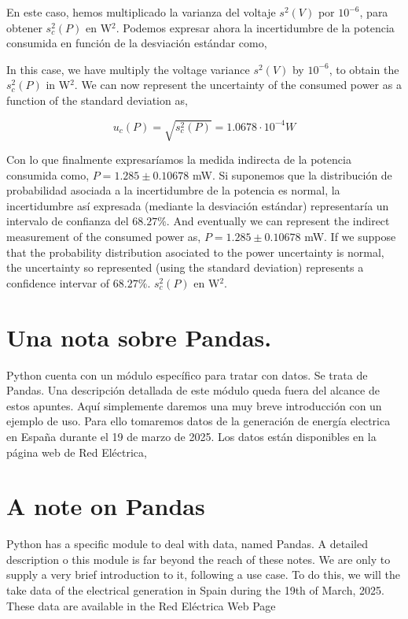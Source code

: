 \begin{paracol}{2}
En este caso, hemos multiplicado la varianza del voltaje $s^2(V)$ por $10^{-6}$, para obtener $s_c^2(P)$ en W$^2$. Podemos expresar ahora la incertidumbre de la potencia consumida en función de la desviación estándar como,

\switchcolumn
In this case, we have multiply the voltage variance $s^2(V)$ by $10^{-6}$, to obtain the $s_c^2(P)$ in W$^2$. We can now represent the uncertainty of the consumed power as a function of the standard deviation as,
\end{paracol}
\begin{equation*}
u_c(P) = \sqrt{s_c^2(P)} =  1.0678\cdot 10^{-4} W
\end{equation*}
\begin{paracol}{2}
Con lo que finalmente expresaríamos la medida indirecta de la potencia consumida como, $P = 1.285 \pm 0.10678 $ mW. Si suponemos que la distribución de probabilidad asociada a la incertidumbre de la potencia es normal, la incertidumbre así expresada (mediante la desviación estándar) representaría un intervalo de confianza del $68.27\%$. 
\switchcolumn
And eventually we can represent the indirect measurement of the consumed power as, $P = 1.285 \pm 0.10678 $ mW. If we suppose that the probability distribution asociated to the power uncertainty is normal, the uncertainty so represented (using the standard deviation) represents a confidence intervar of $68.27\%$. $s_c^2(P)$ en W$^2$.
\end{paracol}
\begin{paracol}{2}
\section{Una nota sobre Pandas.}
Python cuenta con un módulo específico para tratar con datos. Se trata de Pandas. Una descripción detallada de este módulo queda fuera del alcance de estos apuntes. Aquí simplemente daremos una muy breve introducción con un ejemplo de uso. Para ello tomaremos datos de la generación de energía electrica en España durante el 19 de marzo de 2025. Los datos están disponibles en la página web de Red Eléctrica,
\switchcolumn
\section{A note on Pandas}
Python has a specific module to deal with data, named Pandas. A detailed description o this module is far beyond the reach of these notes. We are only to supply a very brief introduction to it, following a use case. To do this, we will the take data of the electrical generation in Spain during  the 19th of March, 2025. These data are available in the Red Eléctrica Web Page  
\end{paracol}



